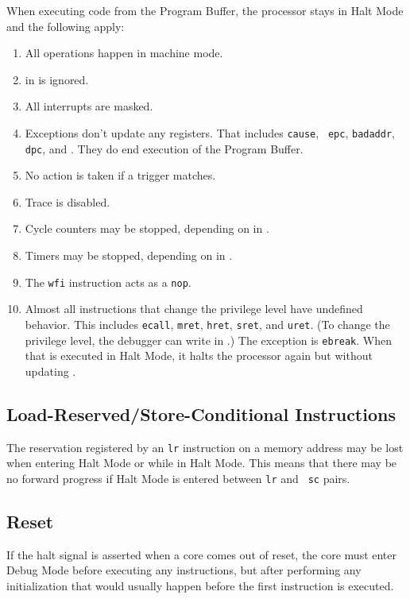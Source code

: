 \documentclass{article}
\newenvironment{steps}[1]
{
   \vspace{1ex}
   \noindent
   #1
   \begin{enumerate}[nosep]
}
{
   \end{enumerate}
   \vspace{1ex}
}
\begin{document}
\begin{steps}{When executing code from the Program Buffer, the processor stays
    in Halt Mode and the following apply:}
\item All operations happen in machine mode.
\item \Fmprv in \Rmstatus is ignored.
\item All interrupts are masked.
\item Exceptions don't update any registers.  That includes {\tt cause}, {\tt
    epc}, {\tt badaddr}, {\tt dpc}, and \Rmstatus. They do end execution of the
    Program Buffer.
\item No action is taken if a trigger matches.
\item Trace is disabled.
\item Cycle counters may be stopped, depending on \Fstopcycle in \Rdcsr.
\item Timers may be stopped, depending on \Fstoptime in \Rdcsr.
\item The {\tt wfi} instruction acts as a {\tt nop}.
\item Almost all instructions that change the privilege level have undefined
    behavior.  This includes {\tt ecall}, {\tt mret}, {\tt hret}, {\tt sret},
    and {\tt uret}.  (To change the privilege level, the debugger can write
    \Fprv in \Rdcsr.) The exception is {\tt ebreak}. When that is executed in
    Halt Mode, it halts the processor again but without updating \Rdpc.
\end{steps}

\subsection{Load-Reserved/Store-Conditional Instructions}

The reservation registered by an {\tt lr} instruction on a memory address may
be lost when entering Halt Mode or while in Halt Mode.  This means that there
may be no forward progress if Halt Mode is entered between {\tt lr} and {\tt
sc} pairs.

\subsection{Reset}

If the halt signal is asserted when a core comes out of reset, the core must
enter Debug Mode before executing any instructions, but after performing any
initialization that would usually happen before the first instruction is
executed.
\end{document}
